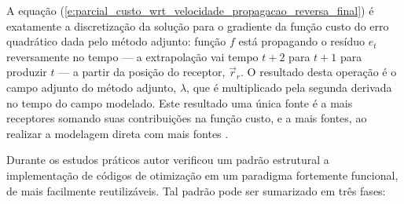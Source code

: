   A equação (\ref{e:parcial_custo_wrt_velocidade_propagacao_reversa_final}) é exatamente a discretização da solução para o gradiente da função custo do erro quadrático dada pelo método adjunto: \DIFdelbegin {}\DIFdelend \DIFaddbegin {}\DIFaddend função $f$ está propagando o resíduo $e_t$ reversamente no tempo --- a extrapolação vai \DIFdelbegin {}\DIFdelend \DIFaddbegin {}\DIFaddend tempo $t+2$ para $t+1$ para \DIFaddbegin {}\DIFaddend produzir $t$ --- a partir da posição do receptor, $\vec{r}_r$. O resultado desta operação é o campo adjunto do método adjunto, $\lambda$, que é multiplicado pela segunda derivada no tempo do campo modelado. Este resultado \DIFdelbegin {}\DIFdelend \DIFaddbegin {}\DIFaddend uma única fonte é \DIFdelbegin {}\DIFdelend \DIFaddbegin {}\DIFaddend a mais receptores somando suas contribuições na função custo, e a mais fontes, ao realizar a modelagem direta com mais fontes .


\DIFdelbegin %
\DIFdelend \DIFaddbegin {} \DIFaddend \label{a:guia_treinamento}

    Durante os estudos práticos \DIFdelbegin {}\DIFdelend \DIFaddbegin {}\DIFaddend autor verificou um padrão estrutural \DIFdelbegin {}\DIFdelend \DIFaddbegin {}\DIFaddend a implementação de códigos de otimização em um paradigma fortemente funcional, de \DIFdelbegin {}\DIFdelend \DIFaddbegin {}\DIFaddend mais facilmente reutilizáveis. Tal padrão pode ser \DIFaddbegin {}\DIFaddend sumarizado em três fases:

